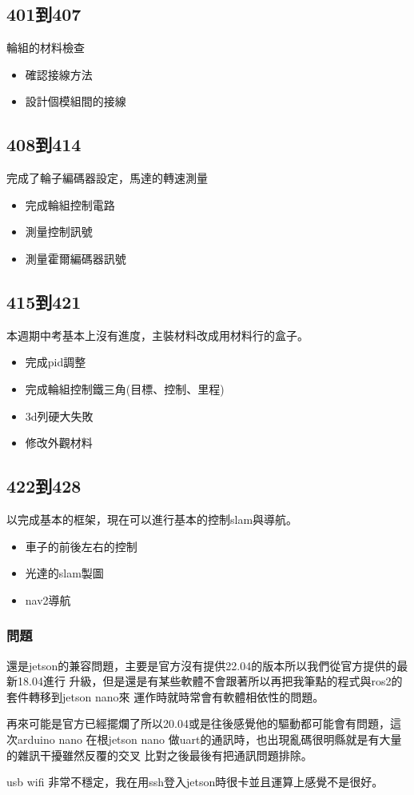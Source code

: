 \subsection{401到407}
輪組的材料檢查
\begin{itemize}
    \item 確認接線方法
    \item 設計個模組間的接線
\end{itemize}
\subsection{408到414}
完成了輪子編碼器設定，馬達的轉速測量
\begin{itemize}
    \item 完成輪組控制電路
    \item 測量控制訊號
    \item 測量霍爾編碼器訊號
\end{itemize}
\subsection{415到421}
本週期中考基本上沒有進度，主裝材料改成用材料行的盒子。
\begin{itemize}
    \item 完成pid調整
    \item 完成輪組控制鐵三角(目標、控制、里程)
    \item 3d列硬大失敗
    \item 修改外觀材料
\end{itemize}
\subsection{422到428}
以完成基本的框架，現在可以進行基本的控制slam與導航。
\begin{itemize}
    \item 車子的前後左右的控制
    \item 光達的slam製圖
    \item nav2導航
\end{itemize}

\subsubsection{問題}
還是jetson的兼容問題，主要是官方沒有提供22.04的版本所以我們從官方提供的最新18.04進行
升級，但是還是有某些軟體不會跟著所以再把我筆點的程式與ros2的套件轉移到jetson nano來
運作時就時常會有軟體相依性的問題。

再來可能是官方已經擺爛了所以20.04或是往後感覺他的驅動都可能會有問題，這次arduino nano
在根jetson nano 做uart的通訊時，也出現亂碼很明縣就是有大量的雜訊干擾雖然反覆的交叉
比對之後最後有把通訊問題排除。

usb wifi 非常不穩定，我在用ssh登入jetson時很卡並且運算上感覺不是很好。


